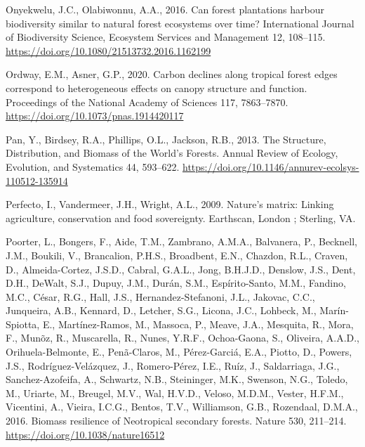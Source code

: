 \documentclass[
  12pt,
]{article}
\newlength{\cslhangindent}
\newlength{\cslentryspacingunit} %
\newenvironment{CSLReferences}[2] %
 {%
  \setlength{\parindent}{0pt}
  \ifodd #1
  \let\oldpar\par
  \def\par{\hangindent=\cslhangindent\oldpar}
  \fi
  \setlength{\parskip}{#2\cslentryspacingunit}
 }%
 {}
\begin{document}
\begin{CSLReferences}{1}{0}
\leavevmode{}%
Onyekwelu, J.C., Olabiwonnu, A.A., 2016. Can forest plantations harbour biodiversity similar to natural forest ecosystems over time? International Journal of Biodiversity Science, Ecosystem Services and Management 12, 108--115. \url{https://doi.org/10.1080/21513732.2016.1162199}

\leavevmode{}%
Ordway, E.M., Asner, G.P., 2020. Carbon declines along tropical forest edges correspond to heterogeneous effects on canopy structure and function. Proceedings of the National Academy of Sciences 117, 7863--7870. \url{https://doi.org/10.1073/pnas.1914420117}

\leavevmode{}%
Pan, Y., Birdsey, R.A., Phillips, O.L., Jackson, R.B., 2013. The {Structure}, {Distribution}, and {Biomass} of the {World}'s {Forests}. Annual Review of Ecology, Evolution, and Systematics 44, 593--622. \url{https://doi.org/10.1146/annurev-ecolsys-110512-135914}

\leavevmode{}%
Perfecto, I., Vandermeer, J.H., Wright, A.L., 2009. Nature's matrix: Linking agriculture, conservation and food sovereignty. {Earthscan}, {London ; Sterling, VA}.

\leavevmode{}%
Poorter, L., Bongers, F., Aide, T.M., Zambrano, A.M.A., Balvanera, P., Becknell, J.M., Boukili, V., Brancalion, P.H.S., Broadbent, E.N., Chazdon, R.L., Craven, D., Almeida-Cortez, J.S.D., Cabral, G.A.L., Jong, B.H.J.D., Denslow, J.S., Dent, D.H., DeWalt, S.J., Dupuy, J.M., Durán, S.M., Espírito-Santo, M.M., Fandino, M.C., César, R.G., Hall, J.S., Hernandez-Stefanoni, J.L., Jakovac, C.C., Junqueira, A.B., Kennard, D., Letcher, S.G., Licona, J.C., Lohbeck, M., Marín-Spiotta, E., Martínez-Ramos, M., Massoca, P., Meave, J.A., Mesquita, R., Mora, F., Munõz, R., Muscarella, R., Nunes, Y.R.F., Ochoa-Gaona, S., Oliveira, A.A.D., Orihuela-Belmonte, E., Penã-Claros, M., Pérez-Garciá, E.A., Piotto, D., Powers, J.S., Rodríguez-Velázquez, J., Romero-Pérez, I.E., Ruíz, J., Saldarriaga, J.G., Sanchez-Azofeifa, A., Schwartz, N.B., Steininger, M.K., Swenson, N.G., Toledo, M., Uriarte, M., Breugel, M.V., Wal, H.V.D., Veloso, M.D.M., Vester, H.F.M., Vicentini, A., Vieira, I.C.G., Bentos, T.V., Williamson, G.B., Rozendaal, D.M.A., 2016. Biomass resilience of {Neotropical} secondary forests. Nature 530, 211--214. \url{https://doi.org/10.1038/nature16512}


\end{CSLReferences}
\end{document}
